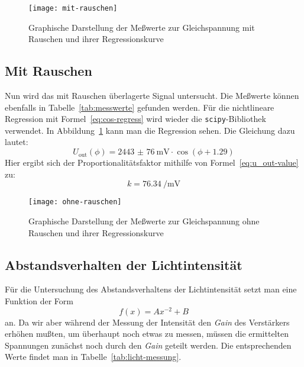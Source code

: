 \begin{figure}
  \centering
  \texttt{[image: mit-rauschen]}
  \caption{Graphische Darstellung der Meßwerte zur Gleichspannung mit
    Rauschen und ihrer Regressionskurve}
  \label{fig:mit-rauschen}
\end{figure}

\subsection{Mit Rauschen}

Nun wird das mit Rauschen überlagerte Signal untersucht. Die Meßwerte
können ebenfalls in Tabelle~\ref{tab:messwerte} gefunden werden. Für die
nichtlineare Regression mit Formel~\eqref{eq:cos-regress} wird wieder
die \texttt{scipy}-Bibliothek verwendet. In
Abbildung~\ref{fig:mit-rauschen} kann man die Regression sehen. Die
Gleichung dazu lautet:
%
\begin{equation}
  \label{eq:cos-regress-result-noise}
  U_\text{out}(\phi) = \SI{2443(76)}{\milli\volt} \cdot 
  \cos(\phi + \num{1.29})
\end{equation}
%
Hier ergibt sich der Proportionalitätsfaktor mithilfe von
Formel~\eqref{eq:u_out-value} zu:
%
\begin{equation}
  \label{eq:propt-value}
  k = \SI{76.34}{\per\milli\volt}
\end{equation}



\begin{figure}
  \centering
  \texttt{[image: ohne-rauschen]}
  \caption{Graphische Darstellung der Meßwerte zur Gleichspannung ohne
    Rauschen und ihrer Regressionskurve}
  \label{fig:ohne-rauschen}
\end{figure}

\subsection{Abstandsverhalten der Lichtintensität}

Für die Untersuchung des Abstandsverhaltens der Lichtintensität setzt
man eine Funktion der Form
%
\begin{equation}
  \label{eq:regressionsfunktion}
  f(x) = Ax^{-2} + B
\end{equation}
%
an. Da wir aber während der Messung der Intensität den \emph{Gain} des
Verstärkers erhöhen mußten, um überhaupt noch etwas zu messen, müssen
die ermittelten Spannungen zunächst noch durch den \emph{Gain} geteilt
werden. Die entsprechenden Werte findet man in
Tabelle~\ref{tab:licht-messung}. 

